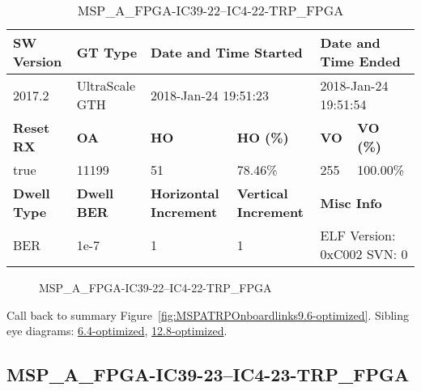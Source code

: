 \begin{table}[h]
\centering
\caption{MSP\_A\_FPGA-IC39-22--IC4-22-TRP\_FPGA}
\label{tab:MSPAFPGAIC3922IC422TRPFPGA9.6-optimized}
\begin{tabular}{@{}|l|l|l|l|l|l|@{}}
\toprule
\textbf{SW Version}                & \textbf{GT Type}   & \multicolumn{2}{l|}{\textbf{Date and Time Started}}            & \multicolumn{2}{l|}{\textbf{Date and Time Ended}}        \\ \midrule
2017.2                       & UltraScale GTH          & \multicolumn{2}{l|}{2018-Jan-24 19:51:23}                   & \multicolumn{2}{l|}{2018-Jan-24 19:51:54}               \\ \midrule
\textbf{Reset RX}                  & \textbf{OA} & \textbf{HO}   & \textbf{HO (\%)} & \textbf{VO} & \textbf{VO (\%)} \\ \midrule
true & 11199        & 51          & 78.46\%        & 255        & 100.00\%       \\ \midrule
\textbf{Dwell Type}                & \textbf{Dwell BER} & \textbf{Horizontal Increment} & \textbf{Vertical Increment}    & \multicolumn{2}{l|}{\textbf{Misc Info}}                  \\ \midrule
BER                            & 1e-7        & 1        & 1           & \multicolumn{2}{l|}{ELF Version: 0xC002 SVN: 0}                         \\ \bottomrule
\end{tabular}
\end{table}

\begin{figure}[h]
\caption{MSP\_A\_FPGA-IC39-22--IC4-22-TRP\_FPGA} \label{fig:MSPAFPGAIC3922IC422TRPFPGA9.6-optimized}
\end{figure}

Call back to summary Figure~\ref{fig:MSPATRPOnboardlinks9.6-optimized}.
Sibling eye diagrams: \hyperref[sec:MSPAFPGAIC3922IC422TRPFPGA6.4-optimized]{6.4-optimized}, \hyperref[sec:MSPAFPGAIC3922IC422TRPFPGA12.8-optimized]{12.8-optimized}.

\clearpage
\newpage


\subsection{MSP\_A\_FPGA-IC39-23--IC4-23-TRP\_FPGA}\label{sec:MSPAFPGAIC3923IC423TRPFPGA9.6-optimized}

